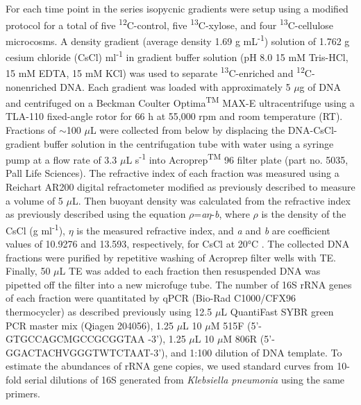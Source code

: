 For each time point in the series isopycnic gradients were setup using a modified protocol \cite{Neufeld_2007} for a total of five \textsuperscript{12}C-control, five \textsuperscript{13}C-xylose, and four \textsuperscript{13}C-cellulose microcosms. A density gradient (average density 1.69 g mL\textsuperscript{-1}) solution of 1.762 g cesium chloride (CsCl) ml\textsuperscript{-1} in gradient buffer solution (pH 8.0 15 mM Tris-HCl, 15 mM EDTA, 15 mM KCl) was used to separate \textsuperscript{13}C-enriched and \textsuperscript{12}C-nonenriched DNA. Each gradient was loaded with approximately 5 $\mu$g of DNA and centrifuged on a Beckman Coulter Optima\textsuperscript{TM} MAX-E ultracentrifuge using a TLA-110 fixed-angle rotor for 66 h at 55,000 rpm and room temperature (RT). Fractions of $\sim$100 $\mu$L were collected from below by displacing the DNA-CsCl-gradient buffer solution in the centrifugation tube with water using a syringe pump at a flow rate of 3.3 $\mu$L s\textsuperscript{-1} \cite{Manefield_2002} into Acroprep\textsuperscript{TM} 96 filter plate (part no. 5035, Pall Life Sciences). The refractive index of each fraction was measured using a Reichart AR200 digital refractometer modified as previously described \cite{Buckley_2007} to measure a volume of 5 $\mu$L. Then buoyant density was calculated from the refractive index as previously described \cite{Buckley_2007} using the equation $\rho$=\textit{a}$\eta$-\textit{b}, where $\rho$ is the density of the CsCl (g ml\textsuperscript{-1}), $\eta$ is the measured refractive index, and \textit{a} and \textit{b} are coefficient values of 10.9276 and 13.593, respectively, for CsCl at 20°C \cite{9780408708036}. The collected DNA fractions were purified by repetitive washing of Acroprep filter wells with TE. Finally, 50 $\mu$L TE was added to each fraction then resuspended DNA was pipetted off the filter into a new microfuge tube. The number of 16S rRNA genes of each fraction were quantitated by qPCR (Bio-Rad C1000/CFX96 thermocycler) as described previously \cite{Berthrong_2013} using 12.5 $\mu$L QuantiFast SYBR green PCR  master mix (Qiagen 204056), 1.25 $\mu$L 10 $\mu$M 515F (5'-GTGCCAGCMGCCGCGGTAA -3'), 1.25 $\mu$L 10 $\mu$M 806R (5'-GGACTACHVGGGTWTCTAAT-3'), and 1:100 dilution of DNA template. To estimate the abundances of rRNA gene copies, we used standard curves from 10-fold serial dilutions of 16S generated from \textit{Klebsiella pneumonia} using the same primers.   

